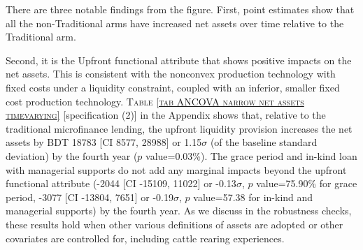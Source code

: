 	There are three notable findings from the figure. First, point estimates show that all the non-\textsf{Traditional} arms have increased net assets over time relative to the \textsf{Traditional} arm. 


Second, it is the \textsf{Upfront} functional attribute that shows positive impacts on the net assets. This is consistent with the nonconvex production technology with fixed costs under a liquidity constraint, coupled with an inferior, smaller fixed cost production technology. \textsc{\normalsize Table \ref{tab ANCOVA narrow net assets timevarying}} [specification (2)] in the Appendix shows that, relative to the traditional microfinance lending, the upfront liquidity provision increases the net assets by BDT 
	18783 
	[CI 8577, 28988] or 1.15$\sigma$ (of the baseline standard deviation) by the fourth year ($p$ value=0.03\%). The grace period and in-kind loan with managerial supports do not add any marginal impacts beyond the upfront functional attribute 
(-2044 [CI -15109, 11022] or -0.13$\sigma$, $p$ value=75.90\% for grace period, 
-3077 [CI -13804, 7651] or -0.19$\sigma$, $p$ value=57.38 for in-kind and managerial supports) 
by the fourth year. 
	As we discuss in the robustness checks, these results hold when other various definitions of assets are adopted or other covariates are controlled for, including cattle rearing experiences.

